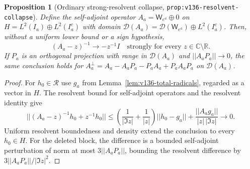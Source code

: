 \documentclass[11pt]{article}
\def\norm#1{||#1||}%
\newtheorem{proposition}[theorem]{Proposition}
\theoremstyle{remark}
\newcommand{\norm}[1]{\left\lVert #1\right\rVert}
\begin{document}
\begin{proposition}[Ordinary strong-resolvent collapse, \texttt{prop:v136-resolvent-collapse}]
\label{prop:v136-resolvent-collapse}
Define the self-adjoint operator $A_a = \mathsf{W}_{e^a} \oplus 0$ on $H = L^2(I_a) \oplus L^2(I_a^c)$ with domain $\mathcal{D}(A_a) = \mathcal{D}(\mathsf{W}_{e^a}) \oplus L^2(I_a^c)$. Then, without a uniform lower bound or a sign hypothesis,
\begin{equation}\label{eq:v136-resolvent-collapse}
  (A_a - z)^{-1} \longrightarrow -z^{-1}I \quad \text{strongly for every } z \in \mathbb{C} \setminus \mathbb{R}.
\end{equation}
If $P_a$ is an orthogonal projection with range in $\mathcal{D}(A_a)$ and $\norm{A_a P_a} \to 0$, the same conclusion holds for $A_a^\perp = A_a - A_a P_a - P_a A_a + P_a A_a P_a$ on $\mathcal{D}(A_a)$.
\end{proposition}
\begin{proof}
For $h_0 \in \mathcal{R}$ use $g_a$ from Lemma~\ref{lem:v136-total-radicals}, regarded as a vector in $H$. The resolvent bound for self-adjoint operators and the resolvent identity give
\[
  \norm{(A_a - z)^{-1}h_0 + z^{-1}h_0} \le \left(\frac{1}{|\Im z|} + \frac{1}{|z|}\right)\norm{h_0 - g_a} + \frac{\norm{A_a g_a}}{|z|\,|\Im z|} \longrightarrow 0.
\]
Uniform resolvent boundedness and density extend the conclusion to every $h_0 \in H$. For the deleted block, the difference is a bounded self-adjoint perturbation of norm at most $3\norm{A_a P_a}$, bounding the resolvent difference by $3\norm{A_a P_a}/|\Im z|^2$.
\end{proof}
\end{document}
